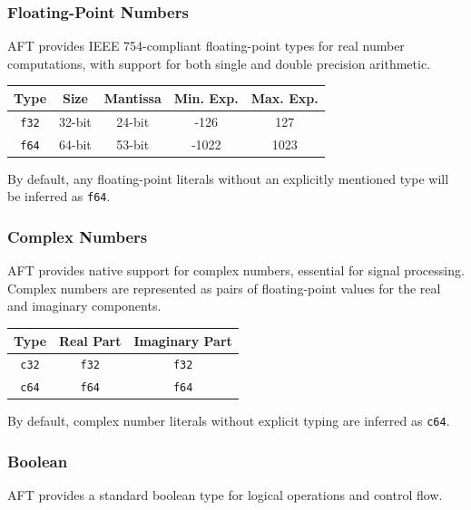 \subsubsection{Floating-Point Numbers}
AFT provides IEEE 754-compliant floating-point types for real number computations, with support for both single and double precision arithmetic.
\begin{table}[H]
    \centering
    \begin{tabular}{ccccc}
        \hline
        \textbf{Type} & \textbf{Size} & \textbf{Mantissa} & \textbf{Min. Exp.} & \textbf{Max. Exp.} \\
        \hline
        \texttt{f32} & 32-bit & 24-bit & -126 & 127 \\
        \texttt{f64} & 64-bit & 53-bit & -1022 & 1023 \\
        \hline
    \end{tabular}
\end{table}
By default, any floating-point literals without an explicitly mentioned type will be inferred as \texttt{f64}.

\subsubsection{Complex Numbers}
AFT provides native support for complex numbers, essential for signal processing. Complex numbers are represented as pairs of floating-point values for the real and imaginary components.

\begin{table}[H]
    \centering
    \begin{tabular}{ccc}
        \toprule
        \textbf{Type} & \textbf{Real Part} & \textbf{Imaginary Part} \\
        \midrule
        \texttt{c32} & \texttt{f32} & \texttt{f32} \\
        \texttt{c64} & \texttt{f64} & \texttt{f64} \\
        \bottomrule
    \end{tabular}
\end{table}

By default, complex number literals without explicit typing are inferred as \texttt{c64}.

\subsubsection{Boolean}
AFT provides a standard boolean type for logical operations and control flow.


